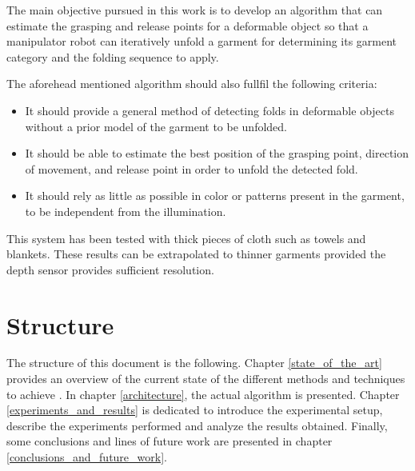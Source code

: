 The main objective pursued in this work is to develop an algorithm that can estimate the grasping and release points for a deformable object so that a manipulator robot can iteratively unfold a garment for determining its garment category and the folding sequence to apply.

The aforehead mentioned algorithm should also fullfil the following criteria:

\begin{itemize}
	\item It should provide a general method of detecting folds in deformable objects without a prior model of the garment to be unfolded.
	\item It should be able to estimate the best position of the grasping point, direction of movement, and release point in order to unfold the detected fold.
	\item It should rely as little as possible in color or patterns present in the garment, to be independent from the illumination.
\end{itemize}

This system has been tested with thick pieces of cloth such as towels and blankets. These results can be extrapolated to thinner garments provided the depth sensor provides sufficient resolution.

\section{Structure}
\label{intro_structure}

The structure of this document is the following. Chapter \ref{state_of_the_art} provides an overview of the current state of the different methods and techniques to achieve . In chapter \ref{architecture}, the actual algorithm is presented. Chapter \ref{experiments_and_results} is dedicated to introduce the experimental setup, describe the experiments performed and analyze the results obtained. Finally, some conclusions and lines of future work are presented in chapter \ref{conclusions_and_future_work}.
